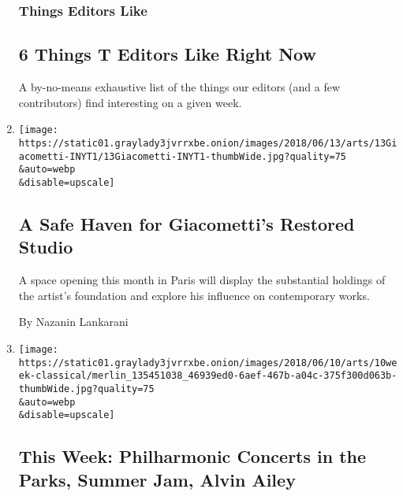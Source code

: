 \begin{enumerate}
  \hypertarget{things-editors-like}{%
  \subsubsection{Things Editors Like}\label{things-editors-like}}

  \hypertarget{6-things-t-editors-like-right-now}{%
  \subsection{6 Things T Editors Like Right
  Now}\label{6-things-t-editors-like-right-now}}

  A by-no-means exhaustive list of the things our editors (and a few
  contributors) find interesting on a given week.
\item
  \href{/2018/06/12/arts/alberto-giacometti-francis-bacon-basel.html}{}

  \texttt{[image: https://static01.graylady3jvrrxbe.onion/images/2018/06/13/arts/13Giacometti-INYT1/13Giacometti-INYT1-thumbWide.jpg?quality=75\\\&auto=webp\\\&disable=upscale]}

  \hypertarget{a-safe-haven-for-giacomettis-restored-studio}{%
  \subsection{A Safe Haven for Giacometti's Restored
  Studio}\label{a-safe-haven-for-giacomettis-restored-studio}}

  A space opening this month in Paris will display the substantial
  holdings of the artist's foundation and explore his influence on
  contemporary works.

  By Nazanin Lankarani
\item
  \href{/2018/06/08/arts/new-york-philharmonic-summer-jam-alvin-ailey.html}{}

  \texttt{[image: https://static01.graylady3jvrrxbe.onion/images/2018/06/10/arts/10week-classical/merlin\_135451038\_46939ed0-6aef-467b-a04c-375f300d063b-thumbWide.jpg?quality=75\\\&auto=webp\\\&disable=upscale]}

  \hypertarget{this-week-philharmonic-concerts-in-the-parks-summer-jam-alvin-ailey}{%
  \subsection{This Week: Philharmonic Concerts in the Parks, Summer Jam,
  Alvin
  Ailey}\label{this-week-philharmonic-concerts-in-the-parks-summer-jam-alvin-ailey}}


\end{enumerate}
